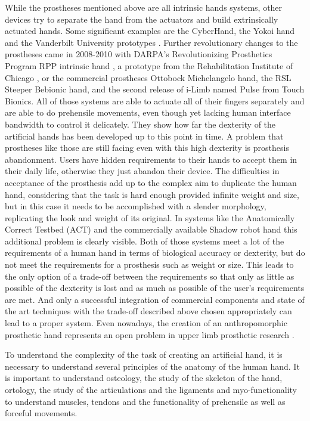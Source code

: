 \documentclass[main]{subfiles}
\begin{document}
While the prostheses mentioned above are all intrinsic hands systems, other devices try to separate the hand from the actuators and build extrinsically actuated hands. Some significant examples are the CyberHand\cite{Carrozza2006}, the Yokoi hand\cite{Ishikawa2000} and the Vanderbilt University prototypes \cite{Fite2008,Dalley2009}. Further revolutionary changes to the prostheses came in 2008-2010 with DARPA's Revolutionizing Prosthetics Program RPP intrinsic hand \cite{Weir2008}, a prototype from the Rehabilitation Institute of Chicago \cite{Mitchell2008}, or the commercial prostheses Ottobock Michelangelo hand, the RSL Steeper Bebionic hand, and the second release of i-Limb named Pulse from Touch Bionics. All of those systems are able to actuate all of their fingers separately and are able to do prehensile movements, even though yet lacking human interface bandwidth to control it delicately. They show how far the dexterity of the artificial hands has been developed up to this point in time. A problem that prostheses like those are still facing even with this high dexterity is prosthesis abandonment. Users have hidden requirements to their hands to accept them in their daily life, otherwise they just abandon their device. The difficulties in acceptance of the prosthesis add up to the complex aim to duplicate the human hand, considering that the task is hard enough provided infinite weight and size, but in this case it needs to be accomplished with a slender morphology, replicating the look and weight of its original. In systems like the Anatomically Correct Testbed (ACT) \cite{Matsuoka2006} and the commercially available Shadow robot hand \cite{shadowrobotcompany} this additional problem is clearly visible. Both of those systems meet a lot of the requirements of a human hand in terms of biological accuracy or dexterity, but do not meet the requirements for a prosthesis such as weight or size. This leads to the only option of a trade-off between the requirements so that only as little as possible of the dexterity is lost and as much as possible of the user's requirements are met. And only a successful integration of commercial components and state of the art techniques with the trade-off described above chosen appropriately can lead to a proper system. Even nowadays, the creation of an anthropomorphic prosthetic hand represents an open problem in upper limb prosthetic research \cite{TheSmartHand2011}.

To understand the complexity of the task of creating an artificial hand, it is necessary to understand several principles of the anatomy of the human hand. It is important to understand osteology, the study of the skeleton of the hand, ortology, the study of the articulations and the ligaments and myo-functionality to understand muscles, tendons and the functionality of prehensile as well as forceful movements.
\end{document}
